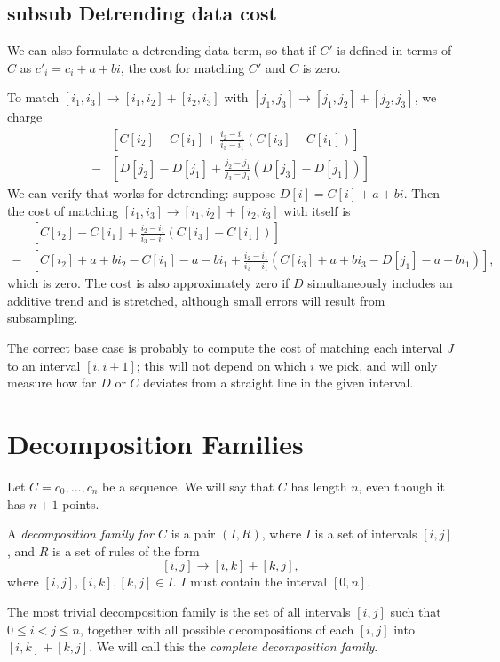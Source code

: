 \subsection{subsub Detrending data cost}
We can also formulate a detrending data term, so that if $C'$ is
defined in terms of $C$ as $c'_i = c_i + a + bi$, the cost for
matching $C'$ and $C$ is zero.

To match $[i_1,i_3]\to [i_1,i_2] + [i_2, i_3]$ with $[j_1,j_3]\to [j_1,j_2] + [j_2, j_3]$, we charge
\begin{align*}
&\left[ C[i_2] - C[i_1] + \frac{i_2 - i_1}{i_3 - i_1}(C[i_3] - C[i_1])\right] \\
-&\left[ D[j_2] - D[j_1] + \frac{j_2 - j_1}{j_3 - j_1}(D[j_3] - D[j_1])\right] 
\end{align*}
We can verify that works for detrending: suppose $D[i] = C[i] + a + bi$. Then the cost of matching 
$[i_1,i_3]\to [i_1,i_2] + [i_2, i_3]$ with itself is
\begin{align*}
&\left[ C[i_2] - C[i_1] + \frac{i_2 - i_1}{i_3 - i_1}(C[i_3] - C[i_1])\right] \\
-&\left[ C[i_2] + a + bi_2 - C[i_1] -a - bi_1 + \frac{i_2 - i_1}{i_3 - i_1}(C[i_3] + a + bi_3 - D[j_1] - a - bi_1)\right],
\end{align*}
which is zero. The cost is also approximately zero if $D$
simultaneously includes an additive trend and is stretched, although
small errors will result from subsampling. 

The correct base case is probably to compute the cost of matching each
interval $J$ to an interval $[i,i+1]$; this will not depend on which
$i$ we pick, and will only measure how far $D$ or $C$ deviates from a
straight line in the given interval.


\section{Decomposition Families}

\begin{defn}
Let $C=c_0,\dots,c_n$ be a sequence. We will say that $C$ has length
$n$, even though it has $n+1$ points.

A {\em decomposition family for $C$} is a pair $(I, R)$, where $I$ is
a set of intervals $[i,j]$, and $R$ is a set of rules of the form
$$[i,j] \to [i,k] + [k,j],$$ where $[i,j], [i,k], [k,j]\in I$. $I$
  must contain the interval $[0,n]$.
\end{defn}

The most trivial decomposition family is the set of all intervals
$[i,j]$ such that $0\le i < j \le n$, together with all possible
decompositions of each $[i,j]$ into $[i,k] + [k,j]$. We will call this
the {\em complete decomposition family}.

